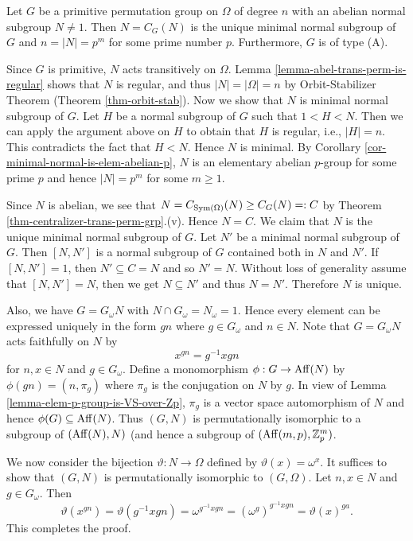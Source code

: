 \begin{proposition} \label{prop-type-A}
	Let $ G $ be a primitive permutation group on $ \Omega $ of degree $ n $ with an abelian normal subgroup $ N \neq 1 $. Then $ N = C_G(N) $ is the unique minimal normal subgroup of $ G $ and $ n = |N| = p^m $ for some prime number $ p $. Furthermore, $G$ is of type (A).
\end{proposition}
\begin{sketch}
	Since $G$ is primitive,  $N$ acts transitively on $\Omega$. Lemma \ref{lemma-abel-trans-perm-is-regular} shows that $N$ is regular, and thus $|N| = |\Omega|=n$ by Orbit-Stabilizer Theorem (Theorem \ref{thm-orbit-stab}). Now we show that $N$ is minimal normal subgroup of $G$. Let $H$ be a normal subgroup of $G$ such that $1<H<N$. Then we can apply the argument above on $H$ to obtain that $H$ is regular, i.e., $|H| = n$. This contradicts the fact that $H<N$. Hence $N$ is minimal. By Corollary \ref{cor-minimal-normal-is-elem-abelian-p}, $N$ is an elementary abelian $p$-group for some prime $p$ and hence $|N| = p^m$ for some $m\geq 1$.
	
	Since $N$ is abelian, we see that $N = C_{\operatorname{Sym}(\Omega)}(N)\geq C_G(N) =:C$ by Theorem \ref{thm-centralizer-trans-perm-grp}.(v). Hence $N=C$. We claim that $N$ is the unique minimal normal subgroup of $G$. Let $N'$ be a minimal normal subgroup of $G$. Then $[N,N']$ is a normal subgroup of $G$ contained both in $N$ and $N'$. If $[N,N'] = 1$, then $N'\subseteq C = N$ and so $N' = N$. Without loss of generality assume that $[N,N']=N$, then   we get $N\subseteq N'$ and thus $N = N'$. Therefore $N$ is unique.
	
	
	Also, we have $G = G_\omega N$ with $N \cap G_\omega = N_\omega = 1$. Hence every element can be expressed uniquely in the form $gn$ where $g\in G_\omega$ and $n\in N$. Note that $G= G_\omega N$ acts faithfully on $N$ by $$ x^{gn} = g^{-1}xgn$$ for $n, x \in N$ and $g \in G_\omega$. Define a monomorphism $\phi:G\rightarrow  \operatorname{Aff}(N)$ by $
	\phi(gn) = (n,\pi_g)$
	where $\pi_g$ is the conjugation on $N$ by $g$. In view of Lemma \ref{lemma-elem-p-group-is-VS-over-Zp}, $\pi_g$ is a vector space automorphism of $N$ and hence $\phi(G)\subseteq \operatorname{Aff}(N)$. Thus $(G,N)$ is permutationally isomorphic to a subgroup of $(\operatorname{Aff}(N), N)$ (and hence a subgroup of $(\operatorname{Aff}(m,p), \mathbb{Z}_p^m)$.
	
	We now consider the bijection $\vartheta : N \to \Omega$ defined by  $\vartheta(x) = \omega^x$. It suffices to show that $(G,N)$ is permutationally isomorphic to $(G,\Omega)$. Let $n,x\in N$ and $g\in G_\omega$. Then
	\begin{equation*}
		\vartheta(x^{gn}) = \vartheta(g^{-1}xgn) =  \omega^{g^{-1}xgn} = (\omega^g)^{g^{-1}xgn} =\vartheta(x)^{ga}.
	\end{equation*}
	This completes the proof.
\end{sketch}




